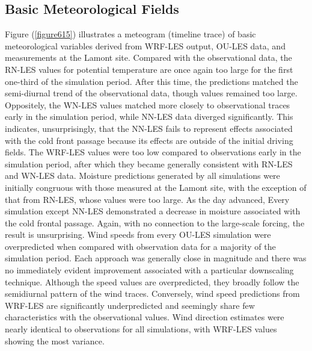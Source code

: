 \subsection{Basic Meteorological Fields}
\label{basic-631}

Figure (\autoref{figure615}) illustrates a meteogram (timeline trace) of basic meteorological variables derived from WRF-LES output, OU-LES data, and measurements at the Lamont site. Compared with the observational data, the RN-LES values for potential temperature are once again too large for the first one-third of the simulation period. After this time, the predictions matched the semi-diurnal trend of the observational data, though values remained too large. Oppositely, the WN-LES values matched more closely to observational traces early in the simulation period, while NN-LES data diverged significantly. This indicates, unsurprisingly, that the NN-LES fails to represent effects associated with the cold front passage because its effects are outside of the initial driving fields. The WRF-LES values were too low compared to observations early in the simulation period, after which they became generally consistent with RN-LES and WN-LES data. Moisture predictions generated by all simulations were initially congruous with those measured at the Lamont site, with the exception of that from RN-LES, whose values were too large. As the day advanced, Every simulation except NN-LES demonstrated a decrease in moisture associated with the cold frontal passage. Again, with no connection to the large-scale forcing, the result is unsurprising. Wind speeds from every OU-LES simulation were overpredicted when compared with observation data for a majority of the simulation period. Each approach was generally close in magnitude and there was no immediately evident improvement associated with a particular downscaling technique. Although the speed values are overpredicted, they broadly follow the semidiurnal pattern of the wind traces. Conversely, wind speed predictions from WRF-LES are significantly underpredicted and seemingly share few characteristics with the observational values. Wind direction estimates were nearly identical to observations for all simulations, with WRF-LES values showing the most variance.


